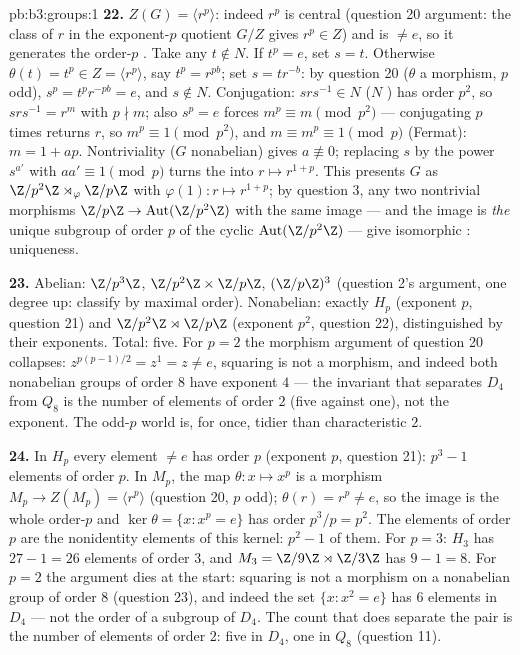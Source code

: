 \begin{solution}{pb:b3:groups:1}
\textbf{22.} $Z(G) = \langle r^p\rangle$: indeed $r^p$ is
central (question 20 argument: the class of $r$ in the
exponent-$p$ quotient $G/Z$ gives $r^p \in Z$) and is $\neq e$,
so it generates the order-$p$ . Take any $t \notin N$. If
$t^p = e$, set $s = t$. Otherwise $\theta(t) = t^p \in Z =
\langle r^p\rangle$, say $t^p = r^{pb}$; set $s = tr^{-b}$: by
question 20 ($\theta$ a morphism, $p$ odd), $s^p =
t^pr^{-pb} = e$, and $s \notin N$. Conjugation: $srs^{-1} \in
N$ ($N$ ) has order $p^2$, so $srs^{-1} = r^m$ with $p
\nmid m$; also $s^p = e$ forces $m^p \equiv m \pmod{p^2}$ ---
conjugating $p$ times returns $r$, so $m^p \equiv 1 \pmod
{p^2}$, and $m \equiv m^p \equiv 1 \pmod p$ (Fermat): $m = 1 +
ap$. Nontriviality ($G$ nonabelian) gives $a \not\equiv 0$;
replacing $s$ by the power $s^{a'}$ with $aa' \equiv 1 \pmod p$
turns the  into $r \mapsto r^{1+p}$. This presents $G$ as
$\Z/p^2\Z\rtimes_\varphi\Z/p\Z$ with $\varphi(1)\colon r
\mapsto r^{1+p}$; by question 3, any two nontrivial morphisms
$\Z/p\Z \to \operatorname{Aut}(\Z/p^2\Z)$ with the same image
--- and the image is \emph{the} unique subgroup of order $p$ of
the cyclic $\operatorname{Aut}(\Z/p^2\Z)$ --- give isomorphic
: uniqueness.

\textbf{23.} Abelian: $\Z/p^3\Z$, $\Z/p^2\Z\times\Z/p\Z$,
$(\Z/p\Z)^3$ (question 2's argument, one degree up: classify by
maximal order). Nonabelian: exactly $H_p$ (exponent $p$,
question 21) and $\Z/p^2\Z\rtimes\Z/p\Z$ (exponent $p^2$,
question 22), distinguished by their exponents. Total: five.
For $p = 2$ the morphism argument of question 20 collapses:
$z^{p(p-1)/2} = z^{1} = z \neq e$, squaring is not a morphism,
and indeed both nonabelian groups of order $8$ have exponent
$4$ --- the invariant that separates $D_4$ from $Q_8$ is the
number of elements of order $2$ (five against one), not the
exponent. The odd-$p$ world is, for once, tidier than
characteristic $2$.

\textbf{24.} In $H_p$ every element $\neq e$ has order $p$
(exponent $p$, question 21): $p^3 - 1$ elements of order $p$.
In $M_p$, the map $\theta \colon x \mapsto x^p$ is a morphism
$M_p \to Z(M_p) = \langle r^p\rangle$ (question 20, $p$ odd);
$\theta(r) = r^p \neq e$, so the image is the whole order-$p$
 and $\ker\theta = \{x : x^p = e\}$ has order $p^3/p =
p^2$. The elements of order $p$ are the nonidentity elements
of this kernel: $p^2 - 1$ of them. For $p = 3$: $H_3$ has
$27 - 1 = 26$ elements of order $3$, and $M_3 = \Z/9\Z \rtimes
\Z/3\Z$ has $9 - 1 = 8$. For $p = 2$ the argument dies at the
start: squaring is not a morphism on a nonabelian group of
order $8$ (question 23), and indeed the set $\{x : x^2 = e\}$
has $6$ elements in $D_4$ --- not the order of a subgroup of
$D_4$. The count that does separate the pair is the number of
elements of order $2$: five in $D_4$, one in $Q_8$ (question
11).


\end{solution}
